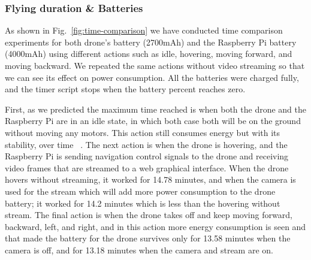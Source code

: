 \documentclass[../main.tex]{subfiles}
\begin{document}
\subsubsection{Flying duration \& Batteries}

As shown in Fig.~\ref{fig:time-comparison} we have 
conducted time comparison experiments for both drone's
battery (2700mAh) and the Raspberry Pi battery (4000mAh) 
using different actions such as idle, hovering, 
moving forward, and moving backward. We repeated 
the same actions without video streaming so that 
we can see its effect on power consumption. 
All the batteries were charged fully, and the timer 
script stops when the battery percent reaches zero. 

First, as we predicted 
the maximum time reached is when both the drone and 
the Raspberry Pi are in an idle state, in which both case both will 
be on the ground without moving any motors.
This action still consumes energy but with 
its stability, over time ~\cite{Abey18}. 
The next action is when the drone is hovering, and 
the Raspberry Pi is sending navigation control 
signals to the drone and receiving video frames 
that are streamed to a web graphical interface. 
When the drone hovers without streaming, it worked 
for 14.78 minutes, and when the camera is used for 
the stream which will add more power consumption to 
the drone battery; it worked for 14.2 minutes which 
is less than the hovering without stream. The final 
action is when the drone takes off and keep moving 
forward, backward, left, and right, and in this action 
more energy consumption is seen and that made the 
battery for the drone survives only for 13.58 minutes 
when the camera is off, and for 13.18 minutes 
when the camera and stream are on.
\end{document}

